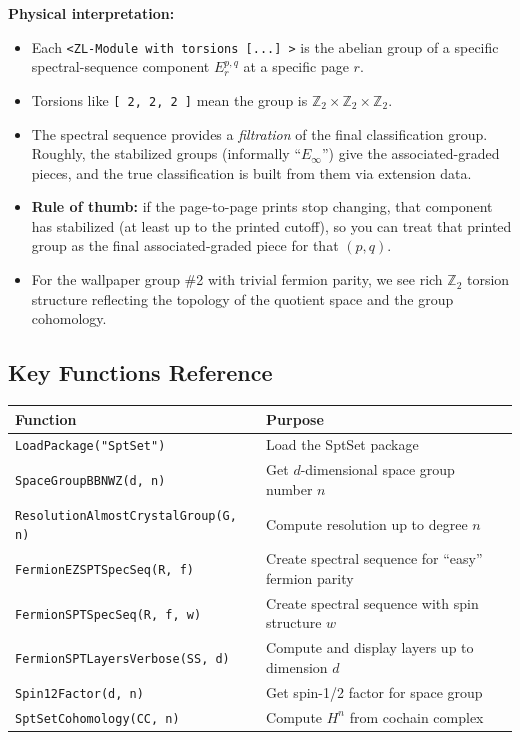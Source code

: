 \documentclass{SciPost}
\begin{document}
\textbf{Physical interpretation:}
\begin{itemize}
    \item Each \texttt{<ZL-Module with torsions [...] >} is the abelian group of a specific spectral-sequence component $E_r^{p,q}$ at a specific page $r$.
    \item Torsions like \texttt{[ 2, 2, 2 ]} mean the group is $\mathbb{Z}_2 \times \mathbb{Z}_2 \times \mathbb{Z}_2$.
    \item The spectral sequence provides a \emph{filtration} of the final classification group. Roughly, the stabilized groups (informally ``$E_\infty$'') give the associated-graded pieces, and the true classification is built from them via extension data.
    \item \textbf{Rule of thumb:} if the page-to-page prints stop changing, that component has stabilized (at least up to the printed cutoff), so you can treat that printed group as the final associated-graded piece for that $(p,q)$.
    \item For the wallpaper group \#2 with trivial fermion parity, we see rich $\mathbb{Z}_2$ torsion structure reflecting the topology of the quotient space and the group cohomology.
\end{itemize}

\subsection{Key Functions Reference}

\begin{center}
\begin{tabular}{|l|p{8cm}|}
\hline
\textbf{Function} & \textbf{Purpose} \\
\hline
\texttt{LoadPackage("SptSet")} & Load the SptSet package \\
\hline
\texttt{SpaceGroupBBNWZ(d, n)} & Get $d$-dimensional space group number $n$ \\
\hline
\texttt{ResolutionAlmostCrystalGroup(G, n)} & Compute resolution up to degree $n$ \\
\hline
\texttt{FermionEZSPTSpecSeq(R, f)} & Create spectral sequence for ``easy'' fermion parity \\
\hline
\texttt{FermionSPTSpecSeq(R, f, w)} & Create spectral sequence with spin structure $w$ \\
\hline
\texttt{FermionSPTLayersVerbose(SS, d)} & Compute and display layers up to dimension $d$ \\
\hline
\texttt{Spin12Factor(d, n)} & Get spin-1/2 factor for space group \\
\hline
\texttt{SptSetCohomology(CC, n)} & Compute $H^n$ from cochain complex \\
\hline
\end{tabular}
\end{center}
\end{document}
